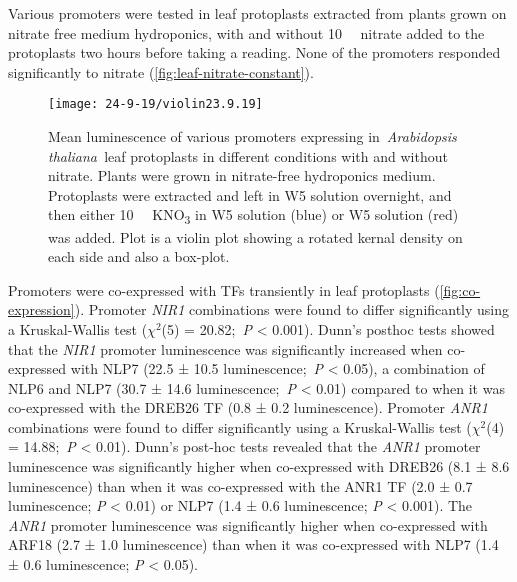 Various promoters were tested in leaf protoplasts extracted from plants grown on nitrate free medium hydroponics, with and without \SI{10}{\milli\Molar} nitrate added to the protoplasts two hours before taking a reading. None of the promoters responded significantly to nitrate
(\autoref{fig:leaf-nitrate-constant}).
\begin{figure}[!ht]
\begin{center}
\capstart
\texttt{[image: 24-9-19/violin23.9.19]}
\caption{
Mean luminescence of various promoters expressing in~\textit{Arabidopsis
thaliana~}leaf protoplasts in different conditions with and without
nitrate. Plants were grown in nitrate\hyp{}free hydroponics medium.
Protoplasts were extracted and left in W5 solution overnight, and then
either \SI{10}{\milli\Molar} KNO\textsubscript{3} in W5 solution (blue) or W5 solution
(red) was added. Plot is a violin plot showing a rotated kernal density
on each side and also a box\hyp{}plot.
\label{fig:leaf-nitrate-constant}
}
\end{center}
\end{figure}



Promoters were co\hyp{}expressed with TFs transiently in leaf protoplasts (\autoref{fig:co-expression}). Promoter \textit{NIR1} combinations were found to differ significantly using a Kruskal-Wallis test ($\chi^2$(5) = 20.82;~\textit{P} \textless{} 0.001).
Dunn's posthoc tests showed that the \textit{NIR1} promoter luminescence was significantly increased when co\hyp{}expressed with NLP7 (22.5 ± 10.5 luminescence;~\textit{P} \textless{} 0.05), a combination of NLP6 and NLP7 (30.7 ± 14.6 luminescence;~\textit{P} \textless{} 0.01) compared to when it was co\hyp{}expressed with the DREB26 TF (0.8 ± 0.2 luminescence).
Promoter \textit{ANR1} combinations were found to differ significantly using a Kruskal-Wallis test ($\chi^2$(4) = 14.88;~\textit{P} \textless{} 0.01).
Dunn's post-hoc tests revealed that the \textit{ANR1} promoter luminescence was significantly higher when co\hyp{}expressed with DREB26 (8.1 ± 8.6 luminescence) than when it was co\hyp{}expressed with the ANR1 TF (2.0 ± 0.7 luminescence; \textit{P} \textless{} 0.01) or NLP7 (1.4 ± 0.6 luminescence; \textit{P} \textless{} 0.001).
The \textit{ANR1} promoter luminescence was significantly higher when co\hyp{}expressed with ARF18 (2.7 ± 1.0 luminescence) than when it was co\hyp{}expressed with NLP7 (1.4 ± 0.6 luminescence; \textit{P} \textless{} 0.05).


